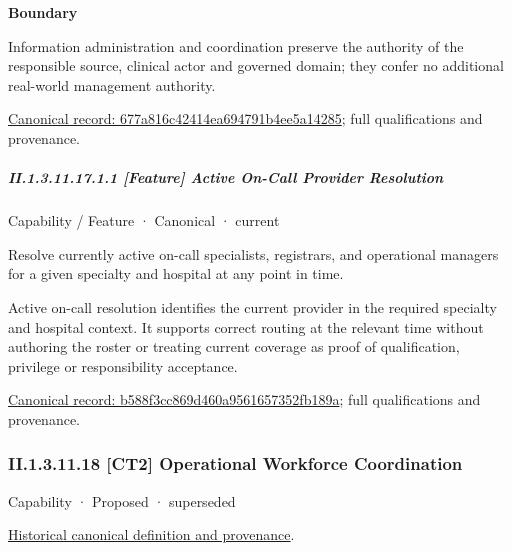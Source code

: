 \textbf{Boundary}



Information administration and coordination preserve the authority of the responsible source, clinical actor and governed domain; they confer no additional real-world management authority.


{\footnotesize \href{../../../../continuum/strategy/capability/677a816c42414ea694791b4ee5a14285.md}{Canonical record: 677a816c42414ea694791b4ee5a14285}; full qualifications and provenance.}\par
\subparagraph*{II.1.3.11.17.1.1 [Feature] Active On-Call Provider Resolution}
\label{navigation:II.1.3.11.17.1.1}

\label{element:b588f3cc869d460a9561657352fb189a}
{\small Capability / Feature · Canonical · current}\par

Resolve currently active on-call specialists, registrars, and operational managers for a given specialty and hospital at any point in time.



Active on-call resolution identifies the current provider in the required specialty and hospital context. It supports correct routing at the relevant time without authoring the roster or treating current coverage as proof of qualification, privilege or responsibility acceptance.


{\footnotesize \href{../../../../continuum/strategy/capability/feature/b588f3cc869d460a9561657352fb189a.md}{Canonical record: b588f3cc869d460a9561657352fb189a}; full qualifications and provenance.}\par
\subsubsection*{II.1.3.11.18 [CT2] Operational Workforce Coordination}
\label{navigation:II.1.3.11.18}

\label{element:66e72222f2064a23adbdb0311092918b}
{\small Capability · Proposed · superseded}\par
\href{../../../../continuum/strategy/capability/66e72222f2064a23adbdb0311092918b.md}{Historical canonical definition and provenance}.\par

